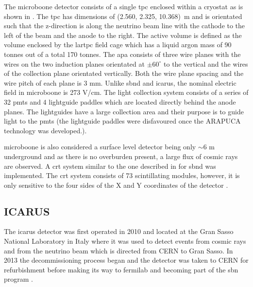 The \gls{microboone} detector consists of a single \gls{tpc} enclosed within a cryostat as is shown in . The \gls{tpc} has dimensions of (2.560, 2.325, 10.368)~m and is orientated such that the z-direction is along the neutrino beam line with the cathode to the left of the beam and the anode to the right. The active volume is defined as the volume enclosed by the \gls{lartpc} field cage which has a liquid argon mass of 90 tonnes out of a total 170 tonnes. The \gls{apa} consists of three wire planes with the wires on the two induction planes orientated at $\pm 60^{\circ}$ to the vertical and the wires of the collection plane orientated vertically. Both the wire plane spacing and the wire pitch of each plane is 3 mm. Unlike \gls{sbnd} and \gls{icarus}, the nominal electric field in \gls{microboone} is 273 V/cm. The light collection system consists of a series of 32 \glspl{pmt} and 4 lightguide paddles which are located directly behind the anode planes. The lightguides have a large collection area and their purpose is to guide light to the \glspl{pmt} (the lightguide paddles were disfavoured once the ARAPUCA technology was developed.)\cite{microboone_detector}.

\gls{microboone} is also considered a surface level detector being only $\sim 6$ m underground and as there is no overburden present, a large flux of cosmic rays are observed. A \gls{crt} system similar to the one described in  for \gls{sbnd} was implemented. The \gls{crt} system consists of 73 scintillating modules, however, it is only sensitive to the four sides of the X and Y coordinates of the detector \cite{microboone_crt}. 


\subsection{ICARUS}\label{sec:ICARUS}

The \gls{icarus} detector was first operated in 2010 and  located at the Gran Sasso National Laboratory in Italy where it was used to detect events from cosmic rays and from the neutrino beam which is directed from CERN to Gran Sasso. In 2013 the decommissioning process began and the detector was taken to CERN for refurbishment before making its way to \gls{fermilab} and becoming part of the \gls{sbn} program \cite{SBN_Proposal}.

